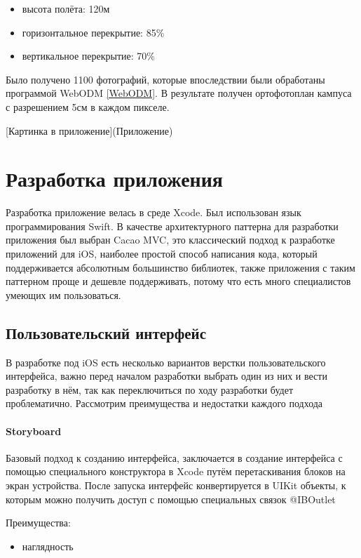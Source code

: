       \begin{itemize}
        \item высота полёта: 120м
        \item горизонтальное перекрытие: 85\%
        \item вертикальное перекрытие: 70\%
      \end{itemize}

      Было получено 1100 фотографий, которые впоследствии были обработаны программой WebODM \ref{WebODM}. В результате получен ортофотоплан кампуса с разрешением 5см в каждом пикселе.

      [Картинка в приложение](Приложение)

\chapter{Разработка приложения}
  Разработка приложение велась в среде Xcode. Был использован язык программирования Swift. В качестве архитектурного паттерна для разработки приложения был выбран Cacao MVC, это классический подход к разработке приложений для iOS, наиболее простой способ написания кода, который поддерживается абсолютным большинство библиотек, также приложения с таким паттерном проще и дешевле поддерживать, потому что есть много специалистов умеющих им пользоваться.

  \section{Пользовательский интерфейс}
    В разработке под iOS есть несколько вариантов верстки пользовательского интерфейса, важно перед началом разработки выбрать один из них и вести разработку в нём, так как переключиться по ходу разработки будет проблематично. Рассмотрим преимущества и недостатки каждого подхода

    \subsubsection{Storyboard}
      Базовый подход к созданию интерфейса, заключается в создание интерфейса с помощью специального конструктора в Xcode путём перетаскивания блоков на экран устройства. После запуска интерфейс конвертируется в UIKit объекты, к которым можно получить доступ с помощью специальных связок @IBOutlet

      \noindent Преимущества:
      \begin{itemize}
        \item наглядность
      \end{itemize}

